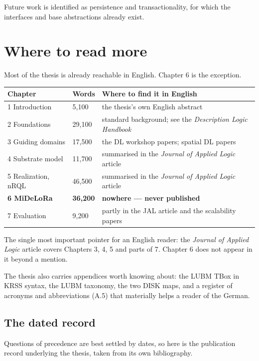 \documentclass[11pt,a4paper,DIV=12,parskip=half]{scrartcl}
\begin{document}
Future work is identified as persistence and transactionality, for which the
interfaces and base abstractions already exist.

\section{Where to read more}

Most of the thesis is already reachable in English. Chapter 6 is the exception.

\begin{center}
\small
\begin{tabular}{@{}llp{6.0cm}@{}}
\toprule
\textbf{Chapter} & \textbf{Words} & \textbf{Where to find it in English} \\
\midrule
1 Introduction      & 5,100  & the thesis's own English abstract \\
2 Foundations       & 29,100 & standard background; see the \emph{Description Logic Handbook} \\
3 Guiding domains   & 17,500 & the DL workshop papers; spatial DL papers \\
4 Substrate model   & 11,700 & summarised in the \emph{Journal of Applied Logic} article \\
5 Realization, nRQL & 46,500 & summarised in the \emph{Journal of Applied Logic} article \\
\textbf{6 MiDeLoRa} & \textbf{36,200} & \textbf{nowhere --- never published} \\
7 Evaluation        & 9,200  & partly in the JAL article and the scalability papers \\
\bottomrule
\end{tabular}
\end{center}

The single most important pointer for an English reader: the \emph{Journal of
Applied Logic} article covers Chapters 3, 4, 5 and parts of 7. Chapter 6 does not
appear in it beyond a mention.

The thesis also carries appendices worth knowing about: the LUBM TBox in KRSS
syntax, the LUBM taxonomy, the two DISK maps, and a register of acronyms and
abbreviations (A.5) that materially helps a reader of the German.

\subsection{The dated record}

Questions of precedence are best settled by dates, so here is the publication
record underlying the thesis, taken from its own bibliography.
\end{document}
